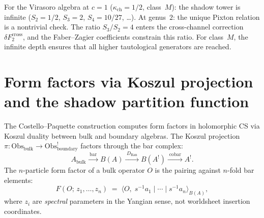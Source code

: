 \begin{remark}[The Virasoro case: class~\texorpdfstring{$M$}{M}, full generation at \texorpdfstring{$g = 2$}{g = 2}]
\label{rem:virasoro-pixton-genus2}
For the Virasoro algebra at $c = 1$ ($\kappa_{\mathrm{ch}} = 1/2$, class~$M$): the shadow tower is infinite ($S_2 = 1/2$, $S_3 = 2$, $S_4 = 10/27$, \ldots). At genus~$2$: the unique Pixton relation is a nontrivial check. The ratio $S_3/S_2 = 4$ enters the cross-channel correction $\delta F_2^{\mathrm{cross}}$, and the Faber--Zagier coefficients constrain this ratio. For class~$M$, the infinite depth ensures that all higher tautological generators are reached.
\end{remark}



\section{Form factors via Koszul projection and the shadow partition function}
\label{sec:form-factor-shadow-pf}

The Costello--Paquette construction computes form factors in holomorphic CS
via Koszul duality between bulk and boundary algebras. The Koszul
projection $\pi \colon \mathrm{Obs}_{\mathrm{bulk}} \to
\mathrm{Obs}_{\mathrm{boundary}}^!$ factors through the bar complex:
\[
 A_{\mathrm{bulk}} \xrightarrow{\;\mathrm{bar}\;}
 B(A) \xrightarrow{\;D_{\mathrm{Ran}}\;}
 B(A^!) \xrightarrow{\;\mathrm{cobar}\;} A^!.
\]
The $n$-particle form factor of a bulk operator $O$ is the pairing
against $n$-fold bar elements:
\[
 F(O;\, z_1, \ldots, z_n) \;=\;
 \langle O,\; s^{-1}a_1 \mid \cdots \mid s^{-1}a_n \rangle_{B(A)},
\]
where $z_i$ are \emph{spectral} parameters in the Yangian sense, not worldsheet
insertion coordinates.

